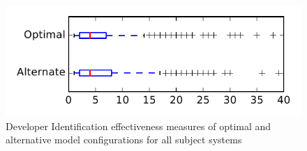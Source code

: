 
\begin{figure}
\centering
\includegraphics[height=0.4\textheight]{figures/combo/dit_rq1_tiny}
\caption{Developer Identification effectiveness measures of optimal and alternative model configurations for all subject systems}
\label{fig:combo:dit:rq1:tiny}
\end{figure}
